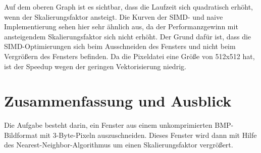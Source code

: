 \documentclass[course=erap]{aspdoc}
\begin{document}
    \begin{center}
    \end{center}

    Auf dem oberen Graph ist es sichtbar, dass die Laufzeit sich quadratisch erhöht, wenn der Skalierungsfaktor ansteigt.
    Die Kurven der SIMD- und naive Implementierung sehen hier sehr ähnlich aus, da der Performanzgewinn mit
    ansteigendem Skalierungsfaktor sich nicht erhöht. Der Grund dafür ist, dass die SIMD-Optimierungen sich beim Ausschneiden
    des Fensters und nicht beim Vergrößern des Fensters befinden. Da die Pixeldatei eine Größe von 512x512 hat, ist der Speedup
    wegen der geringen Vektorisierung niedrig.

    \section{Zusammenfassung und Ausblick}

    Die Aufgabe besteht darin, ein Fenster aus einem unkomprimierten BMP-Bildformat mit 3-Byte-Pixeln auszuschneiden. Dieses Fenster
    wird dann mit Hilfe des Nearest-Neighbor-Algorithmus um einen Skalierungsfaktor vergrößert.
\end{document}
